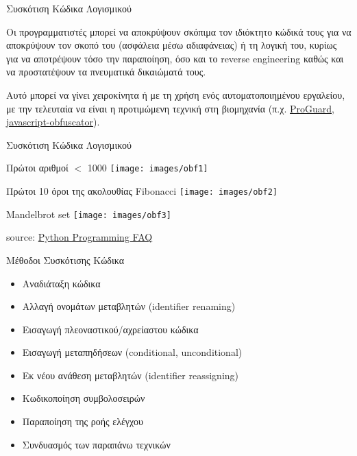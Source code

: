 \documentclass[xcolor=dvipsnames]{beamer}
\newcommand{\lt}{\latintext}
\begin{document}
\begin{frame}{Συσκότιση Κώδικα Λογισμικού}

Οι προγραμματιστές μπορεί να αποκρύψουν σκόπιμα τον ιδιόκτητο κώδικά τους για να αποκρύψουν τον σκοπό του (ασφάλεια μέσω αδιαφάνειας) ή τη λογική του, κυρίως για να αποτρέψουν τόσο την παραποίηση, όσο και το {\lt reverse engineering} καθώς και να προστατέψουν τα πνευματικά δικαιώματά τους.

\hfill

Αυτό μπορεί να γίνει χειροκίνητα ή με τη χρήση ενός αυτοματοποιημένου εργαλείου, με την τελευταία να είναι η προτιμώμενη τεχνική στη βιομηχανία (π.χ. \href{https://www.guardsquare.com/proguard}{\lt ProGuard}, \href{https://www.libhunt.com/r/javascript-obfuscator}{\lt javascript-obfuscator}).

\end{frame}

\begin{frame}{Συσκότιση Κώδικα Λογισμικού}

Πρώτοι αριθμοί $<$ 1000
\texttt{[image: images/obf1]}

\hfill

Πρώτοι 10 όροι της ακολουθίας {\lt Fibonacci}
\texttt{[image: images/obf2]}

\hfill

{\lt Mandelbrot set}
\texttt{[image: images/obf3]}

\hfill

{\lt source: \href{https://docs.python.org/3/faq/programming.html\#is-it-possible-to-write-obfuscated-one-liners-in-python}{Python Programming FAQ}}


\end{frame}

\begin{frame}{Μέθοδοι Συσκότισης Κώδικα}
\begin{itemize}
	\item Αναδιάταξη κώδικα
	\item Αλλαγή ονομάτων μεταβλητών {\lt (identifier renaming)}
	\item Εισαγωγή πλεοναστικού/αχρείαστου κώδικα
	\item Εισαγωγή μεταπηδήσεων {\lt (conditional, unconditional)}
	\item Εκ νέου ανάθεση μεταβλητών {\lt (identifier reassigning)}
	\item Κωδικοποίηση συμβολοσειρών
	\item Παραποίηση της ροής ελέγχου
	\item Συνδυασμός των παραπάνω τεχνικών
\end{itemize}
\end{frame}
\end{document}
